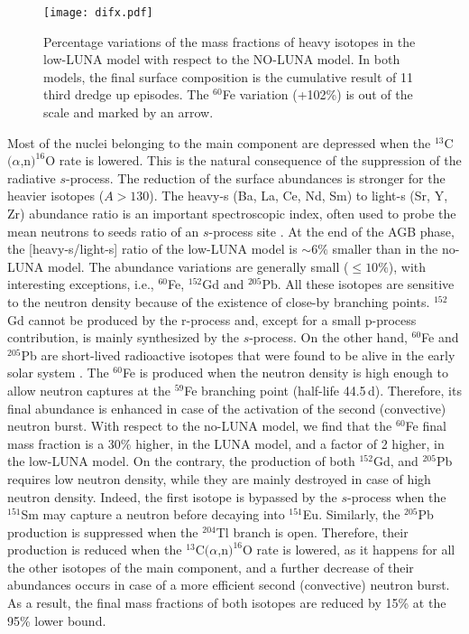 \documentclass[%
reprint,
groupedaddress,
showpacs,
nofootinbib,
amsmath,amssymb,
aps,
prl,
superscriptaddress,
notitlepage,
floatfix
]{revtex4-2}
\begin{document}
\begin{figure}[tb]
    \centering
    \texttt{[image: difx.pdf]}
    \caption{Percentage variations %
    of the mass fractions of heavy isotopes in the low-LUNA model with respect to the NO-LUNA model. In both models, the final surface composition is the cumulative result of 11 third dredge up episodes. The $^{60}$Fe variation (+102\%) is out of the scale and marked by an arrow.}
    \label{fig:difx}
\end{figure}

Most of the nuclei belonging to the main component are depressed when the $^{13}$C$(\alpha$,n$)^{16}$O rate is lowered. This is the natural consequence of the suppression of the radiative $s$-process. The reduction of the surface abundances is stronger for the heavier isotopes ($A>130$). The heavy-s (Ba, La, Ce, Nd, Sm) to light-s (Sr, Y, Zr) abundance ratio is an important spectroscopic index, often used to probe the mean neutrons to seeds ratio of an $s$-process site \cite{Busso:1999}. At the end of the AGB phase, the [heavy-s/light-s] ratio of the low-LUNA model is $\sim6\%$ smaller than in the no-LUNA model. The abundance variations are generally small ($\leq 10\%$), with interesting exceptions, i.e., $^{60}$Fe, $^{152}$Gd and $^{205}$Pb. All these isotopes are sensitive to the neutron density because of the existence of close-by branching points. $^{152}$Gd cannot be produced by the r-process and, except for a small p-process contribution, is mainly synthesized by the $s$-process. On the other hand, $^{60}$Fe and $^{205}$Pb are short-lived radioactive isotopes that were found to be alive in the early solar system \cite{wasserburg2006}. The $^{60}$Fe is produced when the neutron density is high enough to allow neutron captures at the $^{59}$Fe branching point  (half-life 44.5\,d). Therefore, its final abundance is enhanced in case of the activation of the second (convective) neutron burst. With respect to the no-LUNA model, we find that the $^{60}$Fe final mass fraction is a 30\% higher, in the LUNA model, and a factor of 2 higher, in the low-LUNA model. On the contrary, the production of both $^{152}$Gd, and $^{205}$Pb requires low neutron density, while they are mainly destroyed in case of high neutron density. Indeed, the first isotope is bypassed by the $s$-process when the $^{151}$Sm may capture a neutron before decaying into $^{151}$Eu. Similarly, the $^{205}$Pb production is suppressed when the $^{204}$Tl branch is open. Therefore, their production is reduced when the $^{13}$C$(\alpha$,n$)^{16}$O rate is lowered, as it happens for all the other isotopes of the main component, and a further decrease of their abundances occurs in case of a more efficient second (convective) neutron burst. As a result, the final mass fractions of both isotopes are reduced by 15\% at the 95\% lower bound. 
\end{document}
